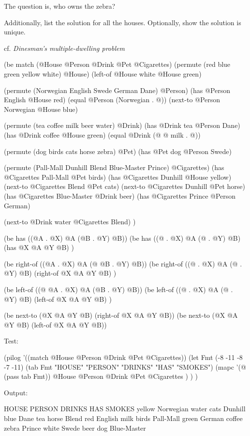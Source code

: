 The question is, who owns the zebra?

Additionally, list the solution for all the houses. Optionally, show the
solution is unique.

cf. \emph{Dinesman's multiple-dwelling problem}



\begin{wideverbatim}

(be match (@House @Person @Drink @Pet @Cigarettes)
   (permute (red blue green yellow white) @House)
   (left-of @House white  @House green)

   (permute (Norwegian English Swede German Dane) @Person)
   (has @Person English  @House red)
   (equal @Person (Norwegian . @))
   (next-to @Person Norwegian  @House blue)

   (permute (tea coffee milk beer water) @Drink)
   (has @Drink tea  @Person Dane)
   (has @Drink coffee  @House green)
   (equal @Drink (@ @ milk . @))

   (permute (dog birds cats horse zebra) @Pet)
   (has @Pet dog  @Person Swede)

   (permute (Pall-Mall Dunhill Blend Blue-Master Prince) @Cigarettes)
   (has @Cigarettes Pall-Mall  @Pet birds)
   (has @Cigarettes Dunhill  @House yellow)
   (next-to @Cigarettes Blend  @Pet cats)
   (next-to @Cigarettes Dunhill  @Pet horse)
   (has @Cigarettes Blue-Master  @Drink beer)
   (has @Cigarettes Prince  @Person German)

   (next-to @Drink water  @Cigarettes Blend) )

\end{wideverbatim}

\begin{wideverbatim}


(be has ((@A . @X) @A (@B . @Y) @B))
(be has ((@ . @X) @A (@ . @Y) @B)
   (has @X @A @Y @B) )

(be right-of ((@A . @X) @A (@ @B . @Y) @B))
(be right-of ((@ . @X) @A (@ . @Y) @B)
   (right-of @X @A @Y @B) )

(be left-of ((@ @A . @X) @A (@B . @Y) @B))
(be left-of ((@ . @X) @A (@ . @Y) @B)
   (left-of @X @A @Y @B) )

(be next-to (@X @A @Y @B) (right-of @X @A @Y @B))
(be next-to (@X @A @Y @B) (left-of @X @A @Y @B))

Test:

(pilog '((match @House @Person @Drink @Pet @Cigarettes))
   (let Fmt (-8 -11 -8 -7 -11)
      (tab Fmt "HOUSE" "PERSON" "DRINKS" "HAS" "SMOKES")
      (mapc '(@ (pass tab Fmt))
         @House @Person @Drink @Pet @Cigarettes ) ) )

Output:

HOUSE   PERSON     DRINKS  HAS    SMOKES
yellow  Norwegian  water   cats   Dunhill
blue    Dane       tea     horse  Blend
red     English    milk    birds  Pall-Mall
green   German     coffee  zebra  Prince
white   Swede      beer    dog    Blue-Master

\end{wideverbatim}

